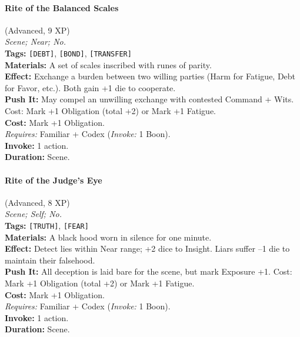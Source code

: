 \paragraph{Rite of the Balanced Scales} (Advanced, 9 XP) \hfill \\
\emph{Scene; Near; No.} \\
\textbf{Tags:} \texttt{[DEBT]}, \texttt{[BOND]}, \texttt{[TRANSFER]} \\
\textbf{Materials:} A set of scales inscribed with runes of parity. \\
\textbf{Effect:} Exchange a burden between two willing parties (Harm for Fatigue, Debt for Favor, etc.). Both gain +1 die to cooperate. \\
\textbf{Push It:} May compel an unwilling exchange with contested Command + Wits. Cost: Mark +1 Obligation (total +2) or Mark +1 Fatigue. \\
\textbf{Cost:} Mark +1 Obligation. \\
\textit{Requires:} Familiar + Codex (\textit{Invoke:} 1 Boon). \\
\textbf{Invoke:} 1 action. \\
\textbf{Duration:} Scene.

\paragraph{Rite of the Judge's Eye} (Advanced, 8 XP) \hfill \\
\emph{Scene; Self; No.} \\
\textbf{Tags:} \texttt{[TRUTH]}, \texttt{[FEAR]} \\
\textbf{Materials:} A black hood worn in silence for one minute. \\
\textbf{Effect:} Detect lies within Near range; +2 dice to Insight. Liars suffer --1 die to maintain their falsehood. \\
\textbf{Push It:} All deception is laid bare for the scene, but mark Exposure +1. Cost: Mark +1 Obligation (total +2) or Mark +1 Fatigue. \\
\textbf{Cost:} Mark +1 Obligation. \\
\textit{Requires:} Familiar + Codex (\textit{Invoke:} 1 Boon). \\
\textbf{Invoke:} 1 action. \\
\textbf{Duration:} Scene.

